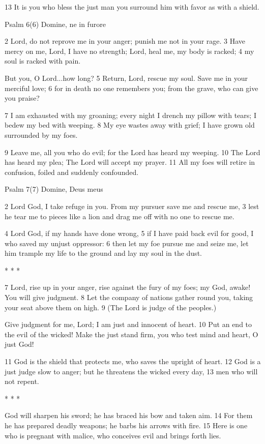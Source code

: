 13 It is you who bless the just man
you surround him with favor as with a shield.


Psalm 6(6) Domine, ne in furore

2 Lord, do not reprove me in your anger;
punish me not in your rage.
3 Have mercy on me, Lord, I have no strength;
Lord, heal me, my body is racked;
4 my soul is racked with pain.

But you, O Lord...how long?
5 Return, Lord, rescue my soul.
Save me in your merciful love;
6 for in death no one remembers you;
from the grave, who can give you praise?

7 I am exhausted with my groaning;
every night I drench my pillow with tears;
I bedew my bed with weeping.
8 My eye wastes away with grief;
I have grown old surrounded by my foes.

9 Leave me, all you who do evil;
for the Lord has heard my weeping.
10 The Lord has heard my plea;
The Lord will accept my prayer.
11 All my foes will retire in confusion,
foiled and suddenly confounded.


Psalm 7(7) Domine, Deus meus

2 Lord God, I take refuge in you.
From my pursuer save me and rescue me,
3 lest he tear me to pieces like a lion
and drag me off with no one to rescue me.

4 Lord God, if my hands have done wrong,
5 if I have paid back evil for good,
I who saved my unjust oppressor:
6 then let my foe pursue me and seize me,
let him trample my life to the ground
and lay my soul in the dust.

* * *

7 Lord, rise up in your anger,
rise against the fury of my foes;
my God, awake! You will give judgment.
8 Let the company of nations gather round you,
taking your seat above them on high.
9 (The Lord is judge of the peoples.)

Give judgment for me, Lord; I am just
and innocent of heart.
10 Put an end to the evil of the wicked!
Make the just stand firm,
you who test mind and heart,
O just God!

11 God is the shield that protects me,
who saves the upright of heart.
12 God is a just judge
slow to anger;
but he threatens the wicked every day,
13 men who will not repent.

* * *

God will sharpen his sword;
he has braced his bow and taken aim.
14 For them he has prepared deadly weapons;
he barbs his arrows with fire.
15 Here is one who is pregnant with malice,
who conceives evil and brings forth lies.

